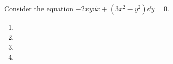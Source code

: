 Consider the equation $-2xy \dd x + (3x^2 -y^2) \dd y = 0$. 
\begin{enumerate}
    \item  \vspace{.5cm}
    \item \vspace{.5cm}
    \item  \newpage
    \item 
  \end{enumerate}